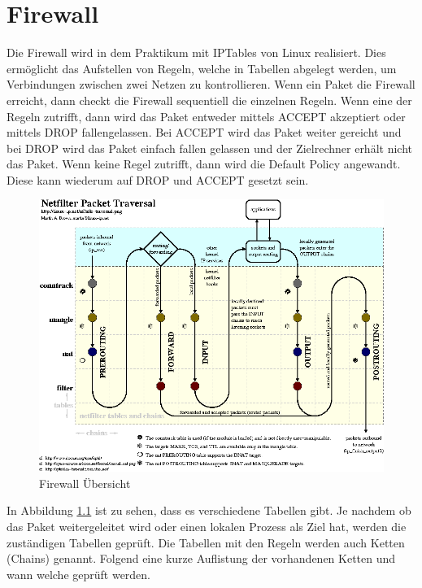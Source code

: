 \chapter{Firewall}\label{fw}
Die Firewall wird in dem Praktikum mit IPTables von Linux realisiert. Dies ermöglicht das Aufstellen von Regeln, welche in Tabellen abgelegt werden, um Verbindungen zwischen zwei Netzen zu kontrollieren. Wenn ein Paket die Firewall erreicht, dann checkt die Firewall sequentiell die einzelnen Regeln. Wenn eine der Regeln zutrifft, dann wird das Paket entweder mittels ACCEPT akzeptiert oder mittels DROP fallengelassen. Bei ACCEPT wird das Paket weiter gereicht und bei DROP wird das Paket einfach fallen gelassen und der Zielrechner erhält nicht das Paket. Wenn keine Regel zutrifft, dann wird die Default Policy angewandt. Diese kann wiederum auf DROP und ACCEPT gesetzt sein.
\begin{figure}
	\centering
		\includegraphics[width=1.00\textwidth]{figures/firewall_uebersicht.PNG}
	\caption{Firewall Übersicht \cite{linux-ip}}
	\label{fig:firewall_uebersicht}
\end{figure}
In Abbildung \ref{fig:firewall_uebersicht} ist zu sehen, dass es verschiedene Tabellen gibt. Je nachdem ob das Paket weitergeleitet wird oder einen lokalen Prozess als Ziel hat, werden die zuständigen Tabellen geprüft. Die Tabellen mit den Regeln werden auch Ketten (Chains) genannt. Folgend eine kurze Auflistung der vorhandenen Ketten und wann welche geprüft werden.
